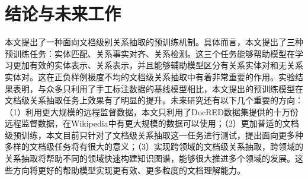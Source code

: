 
\chapter{结论与未来工作}
\label{cha:conclusion}

本文提出了一种面向文档级别关系抽取的预训练机制。具体而言，本文提出了三种预训练任务：实体匹配、关系事实对齐、关系检测。这三个任务能够帮助模型在学习更加有效的实体表示、关系表示，并且能够辅助模型区分有关系实体对和无关系实体对。这在正负样例极度不均的文档级关系抽取中有着非常重要的作用。实验结果表明，与众多只利用了手工标注数据的基线模型相比，本文提出的预训练模型在文档级关系抽取任务上效果有了明显的提升。未来研究还有以下几个重要的方向：（1）利用更大规模的远程监督数据，本文只利用了DocRED数据集提供的十万份远程监督数据，在Wikipedia中有更大规模的数据可以使用；（2）更加普适的文档级预训练，本文目前只针对了文档级关系抽取这一任务进行测试，提出面向更多种多样的文档级任务将有很大的意义；（3）实现跨领域的文档级关系抽取，跨领域的关系抽取将帮助不同的领域快速构建知识图谱，能够很大推进多个领域的发展。这些方向将更好的帮助模型实现更有效、更多粒度的文档理解能力。